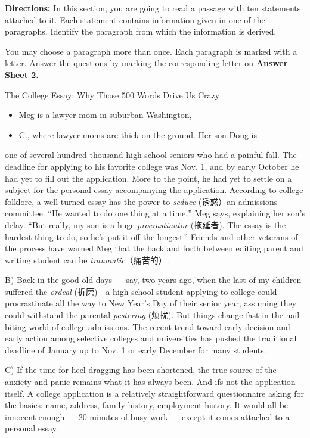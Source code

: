 \documentclass[UTF8,11pt]{ctexart}
\begin{document}
\textbf{Directions:} In this section, you are going to read a passage with ten statements attached to it. Each statement contains information given in one of the paragraphs. Identify the paragraph from which the information is derived.


You may choose a paragraph more than once. Each paragraph is marked with a letter. Answer the questions by marking the corresponding letter on\textbf{ Answer Sheet 2.}


The College Essay: Why Those 500 Words Drive Us Crazy


\begin{itemize}[leftmargin=2em,itemsep=.2em,topsep=.4em]\item[A.] Meg is a lawyer-mom in suburban Washington,
\item[D.] C., where lawyer-moms are thick on the ground. Her son Doug is
\end{itemize}

one of several hundred thousand high-school seniors who had a painful fall. The deadline for applying to his favorite college was Nov. 1, and by early October he had yet to fill out the application. More to the point, he had yet to settle on a subject for the personal essay accompanying the application. According to college folklore, a well-turned essay has the power to\textit{ seduce} (诱惑）an admissions committee. “He wanted to do one thing at a time,” Meg says, explaining her son’s delay. “But really, my son is a huge\textit{ procrastinator} (拖延者). The essay is the hardest thing to do, so he’s put it off the longest.” Friends and other veterans of the process have warned Meg that the back and forth between editing parent and writing student can be\textit{ traumatic}（痛苦的）.


B) Back in the good old days — say, two years ago, when the last of my children suffered the\textit{ ordeal} (折磨)—a high-school student applying to college could procrastinate all the way to New Year’s Day of their senior year, assuming they could withstand the parental\textit{ pestering} (烦扰). But things change fast in the nail-biting world of college admissions. The recent trend toward early decision and early action among selective colleges and universities has pushed the traditional deadline of January up to Nov. 1 or early December for many students.


C) If the time for heel-dragging has been shortened, the true source of the anxiety and panic remains what it has always been. And ifs not the application itself. A college application is a relatively straightforward questionnaire asking for the basics: name, address, family history, employment history. It would all be innocent enough — 20 minutes of busy work — except it comes attached to a personal essay.
\end{document}
